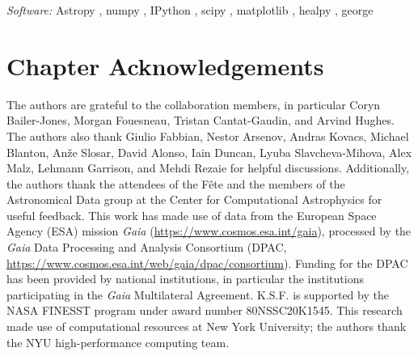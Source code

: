 \textit{Software:} Astropy \citep{the_astropy_collaboration_astropy_2013, the_astropy_collaboration_astropy_2018, the_astropy_collaboration_astropy_2022}, numpy \citep{VanDerWalt2011}, IPython \citep{Perez2007}, scipy \citep{Virtanen2020}, matplotlib \citep{Hunter2007}, healpy \citep{gorski_healpix_2005, zonca_healpy_2019}, george \citep{Ambikasaran2016}

\section{Chapter Acknowledgements}

The authors are grateful to the \Gaia collaboration members, in particular Coryn Bailer-Jones, Morgan Fouesneau, Tristan Cantat-Gaudin, and Arvind Hughes.
The authors also thank Giulio Fabbian, Nestor Arsenov, Andras Kovacs, Michael Blanton, An\v{z}e Slosar, David Alonso, Iain Duncan, Lyuba Slavcheva-Mihova, Alex Malz, Lehmann Garrison, and Mehdi Rezaie for helpful discussions.
Additionally, the authors thank the attendees of the \Gaia F\^{e}te and the members of the Astronomical Data group at the Center for Computational Astrophysics for useful feedback.
This work has made use of data from the European Space Agency (ESA) mission {\it Gaia} (\url{https://www.cosmos.esa.int/gaia}), processed by the {\it Gaia} Data Processing and Analysis Consortium (DPAC, \url{https://www.cosmos.esa.int/web/gaia/dpac/consortium}). 
Funding for the DPAC has been provided by national institutions, in particular the institutions participating in the {\it Gaia} Multilateral Agreement.
K.S.F. is supported by the NASA FINESST program under award number 80NSSC20K1545.
This research made use of computational resources at New York University; the authors thank the NYU high-performance computing team.

